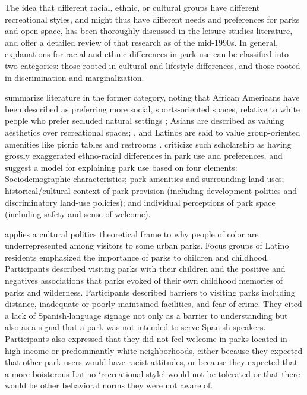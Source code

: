 \documentclass[3p, authoryear]{elsarticle} %
\begin{document}
The idea that different racial, ethnic, or cultural groups have different
recreational styles, and might thus have different needs and preferences for
parks and open space, has been thoroughly discussed in the leisure studies
literature, and \citet{husbands1995ethnicity} offer a detailed review of that research
as of the mid-1990s. In general, explanations for racial and ethnic differences
in park use can be classified into two categories: those rooted in cultural and
lifestyle differences, and those rooted in discrimination and marginalization.

\citet{byrne2009nature} summarize literature in the former category, noting that
African Americans have been described as preferring more social,
sports-oriented spaces, relative to white people who prefer secluded natural
settings \citep{washburne1978black, hutchison1987ethnicity, floyd1999convergence, gobster2002managing, payne2002examination, ho2005gender}; Asians are
described as valuing aesthetics over recreational spaces;
\citep{gobster2002managing, payne2002examination, ho2005gender}, and Latinos are
said to value group-oriented amenities like picnic tables and restrooms
\citep{baas1993influence, hutchison1987ethnicity, irwin1990mexican}.
\citet{byrne2009nature} criticize such scholarship as having grossly exaggerated
ethno-racial differences in park use and preferences, and suggest a model for
explaining park use based on four elements: Sociodemographic characteristics;
park amenities and surrounding land uses; historical/cultural context of park
provision (including development politics and discriminatory land-use
policies); and individual perceptions of park space (including safety and
sense of welcome).

\citet{byrne2012green} applies a cultural politics theoretical frame to why people of
color are underrepresented among visitors to some urban parks. Focus groups of
Latino residents emphasized the importance of parks to children and childhood.
Participants described visiting parks with their children and the positive and
negatives associations that parks evoked of their own childhood memories of
parks and wilderness. Participants described barriers to visiting parks
including distance, inadequate or poorly maintained facilities, and fear of
crime. They cited a lack of Spanish-language signage not only as a barrier to
understanding but also as a signal that a park was not intended to serve
Spanish speakers. Participants also expressed that they did not feel welcome
in parks located in high-income or predominantly white neighborhoods, either
because they expected that other park users would have racist attitudes, or
because they expected that a more boisterous Latino `recreational style' would
not be tolerated or that there would be other behavioral norms they were not
aware of.
\end{document}
